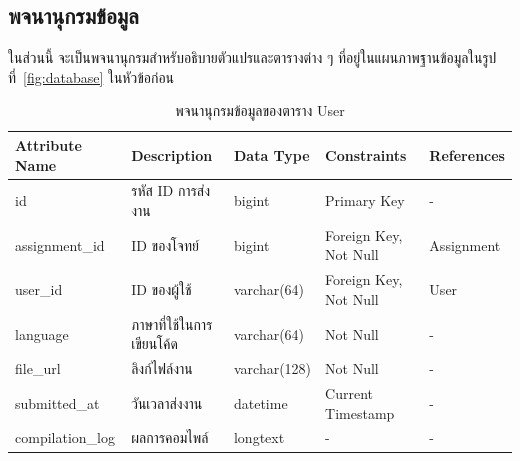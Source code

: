 \documentclass[12pt,one side,openright,a4paper]{cpe-thesis-th}
\begin{document}
\subsection{พจนานุกรมข้อมูล}
ในส่วนนี้ จะเป็นพจนานุกรมสำหรับอธิบายตัวแปรและตารางต่าง ๆ ที่อยู่ในแผนภาพฐานข้อมูลในรูปที่~\ref{fig:database} ในหัวข้อก่อน
\begin{table}[!h]
  \centering
  \caption{พจนานุกรมข้อมูลของตาราง User}\label{tbl:data-dict-user}
  \begin{tabular}{p{2cm}|p{4cm}p{2cm}p{3cm}p{2cm}} \hline\hline
    Attribute Name   & Description         & Data Type    & Constraints           & References \\ \hline\hline
    id               & รหัส ID การส่งงาน     & bigint       & Primary Key           & -          \\
    assignment\_id   & ID ของโจทย์          & bigint       & Foreign Key, Not Null & Assignment \\
    user\_id         & ID ของผู้ใช้           & varchar(64)  & Foreign Key, Not Null & User       \\
    language         & ภาษาที่ใช้ในการเขียนโค้ด & varchar(64)  & Not Null              & -          \\
    file\_url        & ลิงก์ไฟล์งาน           & varchar(128) & Not Null              & -          \\
    submitted\_at    & วันเวลาส่งงาน         & datetime     & Current Timestamp     & -          \\
    compilation\_log & ผลการคอมไพล์         & longtext     & -                     & -          \\ \hline\hline
  \end{tabular}
\end{table}
\end{document}
